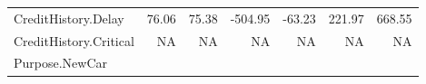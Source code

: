 \documentclass[]{article}
\begin{document}
\begin{longtable}[]{@{}lrrrrrr@{}}
\begin{minipage}[t]{0.31\columnwidth}\raggedright\strut
CreditHistory.Delay\strut
\end{minipage} & \begin{minipage}[t]{0.10\columnwidth}\raggedleft\strut
76.06\strut
\end{minipage} & \begin{minipage}[t]{0.08\columnwidth}\raggedleft\strut
75.38\strut
\end{minipage} & \begin{minipage}[t]{0.08\columnwidth}\raggedleft\strut
-504.95\strut
\end{minipage} & \begin{minipage}[t]{0.08\columnwidth}\raggedleft\strut
-63.23\strut
\end{minipage} & \begin{minipage}[t]{0.08\columnwidth}\raggedleft\strut
221.97\strut
\end{minipage} & \begin{minipage}[t]{0.08\columnwidth}\raggedleft\strut
668.55\strut
\end{minipage}\tabularnewline
\begin{minipage}[t]{0.31\columnwidth}\raggedright\strut
CreditHistory.Critical\strut
\end{minipage} & \begin{minipage}[t]{0.10\columnwidth}\raggedleft\strut
NA\strut
\end{minipage} & \begin{minipage}[t]{0.08\columnwidth}\raggedleft\strut
NA\strut
\end{minipage} & \begin{minipage}[t]{0.08\columnwidth}\raggedleft\strut
NA\strut
\end{minipage} & \begin{minipage}[t]{0.08\columnwidth}\raggedleft\strut
NA\strut
\end{minipage} & \begin{minipage}[t]{0.08\columnwidth}\raggedleft\strut
NA\strut
\end{minipage} & \begin{minipage}[t]{0.08\columnwidth}\raggedleft\strut
NA\strut
\end{minipage}\tabularnewline
\begin{minipage}[t]{0.31\columnwidth}\raggedright\strut
Purpose.NewCar\strut
\end{minipage} & \begin{minipage}[t]{0.10\columnwidth}\raggedleft\strut

\end{minipage}
\end{longtable}
\end{document}
